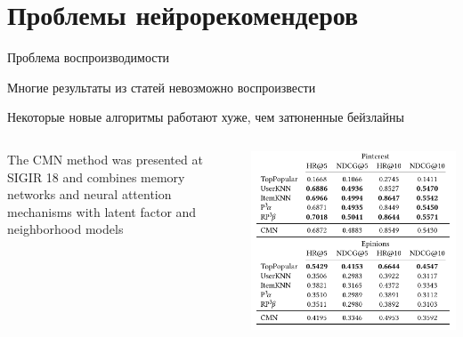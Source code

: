 \documentclass[11pt,aspectratio=169,handout]{beamer}
\begin{document}
\section{Проблемы нейрорекомендеров}

\begin{frame}{Проблема воспроизводимости \cite{PROGRESS}}

\begin{tcolorbox}[colback=warn!5,colframe=warn!80,title=]
Многие результаты из статей невозможно воспроизвести
\end{tcolorbox}

\begin{tcolorbox}[colback=warn!5,colframe=warn!80,title=]
Некоторые новые алгоритмы работают хуже, чем затюненные бейзлайны
\end{tcolorbox}

\begin{columns}
\begin{column}{0.45\textwidth} 
\begin{tcolorbox}[colback=gray!5,colframe=gray!80,title=]
The CMN method was presented at SIGIR 18 and combines memory networks and neural attention mechanisms with latent factor and neighborhood models
\end{tcolorbox}
\end{column}
\begin{column}{0.45\textwidth}
\begin{center}
\includegraphics[scale=0.25]{images/progress.png}
\end{center}
\end{column}
\end{columns}

\end{frame}
\end{document}
